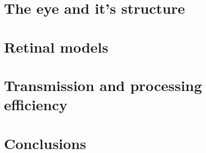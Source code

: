 \section{The eye and it's structure}

\section{Retinal models}

\section{Transmission and processing efficiency}

\section{Conclusions}
